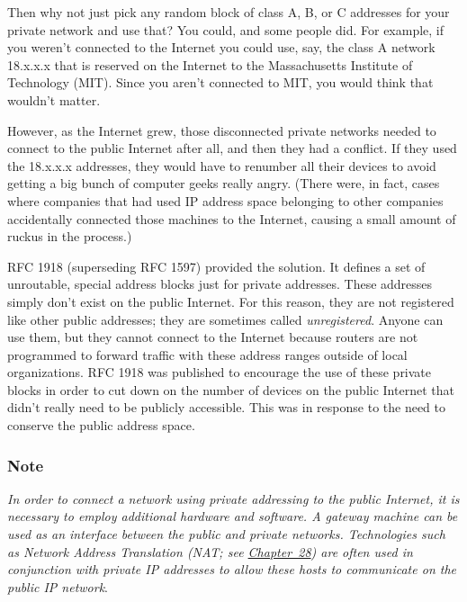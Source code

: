 \documentclass[b5paper,11pt]{memoir}
\begin{document}
Then why not just pick any random block of class A, B, or C addresses
for your private network and use that? You could, and some people did.
For example, if you weren't connected to the Internet you could use,
say, the class A network 18.x.x.x that is reserved on the Internet to
the
\protect\hypertarget{ch17s05.htmlux5cux23idx-CHP-17-0701}{}{}Massachusetts
Institute of Technology (MIT). Since you aren't connected to MIT, you
would think that wouldn't matter.

However, as the Internet grew, those disconnected private networks
needed to connect to the public Internet after all, and then they had a
conflict. If they used the 18.x.x.x addresses, they would have to
renumber all their devices to avoid getting a big bunch of computer
geeks really angry. (There were, in fact, cases where companies that had
used IP address space belonging to other companies accidentally
connected those machines to the Internet, causing a small amount of
ruckus in the process.)

RFC 1918 (superseding RFC 1597) provided the solution. It defines a set
of unroutable, special address blocks just for private addresses. These
addresses simply don't exist on the public Internet. For this reason,
they are not registered like other public addresses; they are sometimes
called {\emph{unregistered}}. Anyone can use them, but they cannot
connect to the Internet because routers are not programmed to forward
traffic with these address ranges outside of local organizations. RFC
1918 was published to encourage the use of these private blocks in order
to cut down on the number of devices on the public Internet that didn't
really need to be publicly accessible. This was in response to the need
to conserve the public address space.

\subsubsection[Note]{\texorpdfstring{\protect\hypertarget{ch17s05.htmlux5cux23note-67}{}{}Note}{Note}}

{\emph{In order to connect a network using private addressing to the
public Internet, it is necessary to employ additional hardware and
software. A gateway machine can be used as an interface between the
public and private networks. Technologies such as Network Address
Translation (NAT; see \protect\hyperlink{ch28.html}{Chapter~28}) are
often used in conjunction with private IP addresses to allow these hosts
to communicate on the public IP
network}}.\protect\hypertarget{ch17s05.htmlux5cux23idx-CHP-17-0702}{}{}
\end{document}
